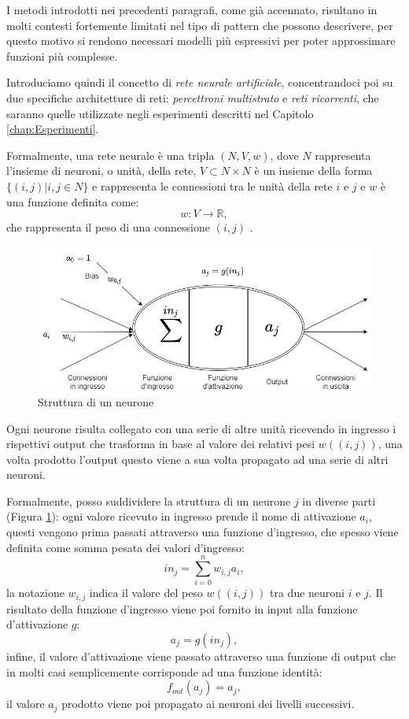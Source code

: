 \documentclass[../../main.tex]{subfiles}
\begin{document}
I metodi introdotti nei precedenti paragrafi, come già accennato, risultano in molti contesti fortemente limitati nel tipo di pattern che possono descrivere, per questo motivo si rendono necessari modelli più espressivi per poter approssimare funzioni più complesse.

Introduciamo quindi il concetto di \textit{rete neurale artificiale}, concentrandoci poi su due specifiche architetture di reti: \textit{percettroni multistrato} e \textit{reti ricorrenti}, che saranno quelle utilizzate negli esperimenti descritti nel Capitolo \ref{chap:Esperimenti}.  

Formalmente, una rete neurale è una tripla $(N, V, w)$, dove $N$ rappresenta l'insieme di neuroni, o unità, della rete, $V \subset N \times N$ è un insieme della forma $\{(i, j) | i,j \in N\}$ e rappresenta le connessioni tra le unità della rete $i$ e $j$ e $w$ è una funzione definita come:
\[w : V \rightarrow \mathbb{R},\]
che rappresenta il peso di una connessione $(i, j)$ \cite{kriesel2007bin}.

\begin{figure}[H]
    \centering
    \includegraphics[width=\textwidth]{immagini/4_2/neuron.png}
    \caption{Struttura di un neurone}
    \label{fig:neuron}
\end{figure}

Ogni neurone risulta collegato con una serie di altre unità ricevendo in ingresso i rispettivi output che trasforma in base al valore dei relativi pesi $w((i,j))$, una volta prodotto l'output questo viene a sua volta propagato ad una serie di altri neuroni.

Formalmente, posso suddividere la struttura di un neurone $j$ in diverse parti (Figura \ref{fig:neuron}): ogni valore ricevuto in ingresso prende il nome di attivazione $a_i$, questi vengono prima passati attraverso una funzione d'ingresso, che spesso viene definita come somma pesata dei valori d'ingresso:
\[in_j = \sum_{i=0}^n {w_{i,j} a_i},\]
la notazione $w_{i,j}$ indica il valore del peso $w((i,j))$ tra due neuroni $i$ e $j$. Il risultato della funzione d'ingresso viene poi fornito in input alla funzione d'attivazione $g$:
\[a_j = g(in_j),\]
infine, il valore d'attivazione viene passato attraverso una funzione di output che in molti casi semplicemente corrisponde ad una funzione identità:
\[f_{out}(a_j) = a_j,\]
il valore $a_j$ prodotto viene poi propagato ai neuroni dei livelli successivi.
\end{document}
